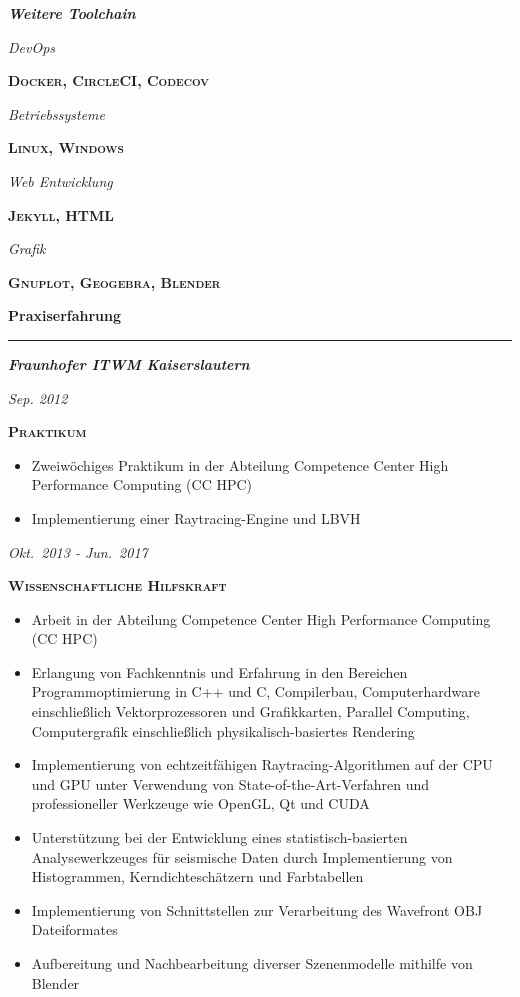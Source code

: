 \documentclass[8pt]{article}
\newcommand{\cvSectionStyle}{%
  \normalfont%
  \Large%
  \color{cvColor}%
  \bfseries%
  \sffamily%
}
\newcommand{\cvSubsectionStyle}{%
  \normalfont%
  \sffamily%
  \itshape%
  \bfseries%
}
\newcommand{\cvTimeStyle}{%
  \normalfont%
  \sffamily%
  \footnotesize%
  \itshape%
}
\newcommand{\cvSection}[1]{%
  \smallskip%
  {%
    \cvSectionStyle #1%
  }\\[-0.5em]
  \rule{\linewidth}{0.8pt}%
  \par%
  \smallskip%
}
\newcommand{\cvSubsection}[1]{%
  \begin{tcolorbox}[left=0pt, top=0pt, bottom=0pt, right=0pt, boxsep=5pt, arc=5pt, frame code={}, colback=cvBackgroundColor]
    \cvSubsectionStyle #1%
  \end{tcolorbox}
}
\newenvironment{cvTimeItem}[2]{
  \par
  \begin{minipage}[c]{0.15\linewidth}
    \raggedleft
    \cvTimeStyle #1
  \end{minipage}
  \quad
  \vrule
  \quad
  \begin{minipage}[t]{0.79\linewidth}
    \sffamily\textsc{\color{cvColor} \textbf{#2}}
    \begin{itemize}[itemsep=0mm, leftmargin=4mm]
      \normalfont\footnotesize\sffamily
}{
    \end{itemize}
  \end{minipage}
  \par%
  \vspace{\baselineskip}%
}
\newenvironment{cvSkillItem}[2]{
  \par
  \begin{minipage}[c]{0.2\linewidth}
    \raggedleft
    \normalfont
    \sffamily
    \itshape
    #1
  \end{minipage}
  \hspace{0.02\linewidth}
  \vrule
  \hspace{0.02\linewidth}
  \begin{minipage}[t]{0.74\linewidth}
    \sffamily\textsc{\color{cvColor} \textbf{#2}}\par
      \normalfont\footnotesize\sffamily
}{
  \end{minipage}
  \par%
  \vspace{\baselineskip}%
}
\begin{document}
  \cvSubsection{Weitere Toolchain}
  \vspace{-1.8em}
  \begin{multicols}{2}
  \begin{cvSkillItem}{DevOps}{Docker, CircleCI, Codecov}
  \end{cvSkillItem}
  \begin{cvSkillItem}{Betriebs\-systeme}{Linux, Windows}
  \end{cvSkillItem}
  \begin{cvSkillItem}{Web Entwicklung}{Jekyll, HTML}
  \end{cvSkillItem}
  \begin{cvSkillItem}{Grafik}{Gnuplot, Geogebra, Blender}
  \end{cvSkillItem}
  \end{multicols}


  \cvSection{Praxiserfahrung}
  \cvSubsection{Fraunhofer ITWM Kaiserslautern}
  \begin{cvTimeItem}{Sep. 2012}{Praktikum}
    \item Zweiwöchiges Praktikum in der Abteilung Competence Center High Performance Computing (CC HPC)
    \item Implementierung einer Raytracing-Engine und LBVH
  \end{cvTimeItem}
  \begin{cvTimeItem}{Okt.~2013 - Jun.~2017}{Wissenschaftliche Hilfskraft}
    \item Arbeit in der Abteilung Competence Center High Performance Computing (CC HPC)
    \item Erlangung von Fachkenntnis und Erfahrung in den Bereichen Programmoptimierung in C++ und C, Compilerbau, Computerhardware einschließlich Vektorprozessoren und Grafikkarten, Parallel Computing, Computergrafik einschließlich physikalisch-basiertes Rendering
    \item Implementierung von echtzeitfähigen Raytracing-Algorithmen auf der CPU und GPU unter Verwendung von State-of-the-Art-Verfahren und professioneller Werkzeuge wie OpenGL, Qt und CUDA
    \item Unterstützung bei der Entwicklung eines statistisch-basierten Analysewerkzeuges für seismische Daten durch Implementierung von Histogrammen, Kerndichteschätzern und Farbtabellen
    \item Implementierung von Schnittstellen zur Verarbeitung des Wavefront OBJ Dateiformates
    \item Aufbereitung und Nachbearbeitung diverser Szenenmodelle mithilfe von Blender
  \end{cvTimeItem}
\end{document}
